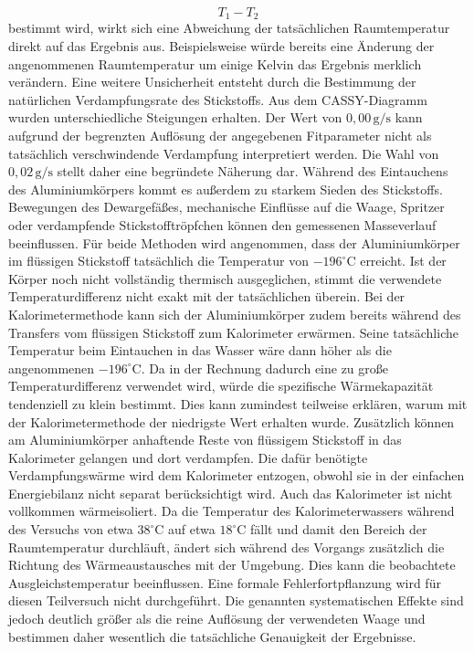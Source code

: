 \documentclass{report}
\begin{document}
\begin{equation}
T_1-T_2
\end{equation}
\noindent
bestimmt wird, wirkt sich eine Abweichung der tatsächlichen Raumtemperatur direkt
auf das Ergebnis aus. Beispielsweise würde bereits eine Änderung der angenommenen
Raumtemperatur um einige Kelvin das Ergebnis merklich verändern.
\noindent
Eine weitere Unsicherheit entsteht durch die Bestimmung der natürlichen
Verdampfungsrate des Stickstoffs. Aus dem CASSY-Diagramm wurden unterschiedliche
Steigungen erhalten. Der Wert von $0{,}00\,\mathrm{g/s}$ kann aufgrund der
begrenzten Auflösung der angegebenen Fitparameter nicht als tatsächlich
verschwindende Verdampfung interpretiert werden. Die Wahl von
$0{,}02\,\mathrm{g/s}$ stellt daher eine begründete Näherung dar.
\noindent
Während des Eintauchens des Aluminiumkörpers kommt es außerdem zu starkem Sieden
des Stickstoffs. Bewegungen des Dewargefäßes, mechanische Einflüsse auf die Waage,
Spritzer oder verdampfende Stickstofftröpfchen können den gemessenen Masseverlauf
beeinflussen.
\noindent
Für beide Methoden wird angenommen, dass der Aluminiumkörper im flüssigen
Stickstoff tatsächlich die Temperatur von $-196^\circ\mathrm{C}$ erreicht.
Ist der Körper noch nicht vollständig thermisch ausgeglichen, stimmt die
verwendete Temperaturdifferenz nicht exakt mit der tatsächlichen überein.
\noindent
Bei der Kalorimetermethode kann sich der Aluminiumkörper zudem bereits während
des Transfers vom flüssigen Stickstoff zum Kalorimeter erwärmen. Seine tatsächliche
Temperatur beim Eintauchen in das Wasser wäre dann höher als die angenommenen
$-196^\circ\mathrm{C}$. Da in der Rechnung dadurch eine zu große
Temperaturdifferenz verwendet wird, würde die spezifische Wärmekapazität
tendenziell zu klein bestimmt. Dies kann zumindest teilweise erklären, warum mit
der Kalorimetermethode der niedrigste Wert erhalten wurde.
\noindent
Zusätzlich können am Aluminiumkörper anhaftende Reste von flüssigem Stickstoff
in das Kalorimeter gelangen und dort verdampfen. Die dafür benötigte
Verdampfungswärme wird dem Kalorimeter entzogen, obwohl sie in der einfachen
Energiebilanz nicht separat berücksichtigt wird.
\noindent
Auch das Kalorimeter ist nicht vollkommen wärmeisoliert. Da die Temperatur des
Kalorimeterwassers während des Versuchs von etwa $38^\circ\mathrm{C}$ auf etwa
$18^\circ\mathrm{C}$ fällt und damit den Bereich der Raumtemperatur durchläuft,
ändert sich während des Vorgangs zusätzlich die Richtung des Wärmeaustausches mit
der Umgebung. Dies kann die beobachtete Ausgleichstemperatur beeinflussen.
\noindent
Eine formale Fehlerfortpflanzung wird für diesen Teilversuch nicht durchgeführt.
Die genannten systematischen Effekte sind jedoch deutlich größer als die reine
Auflösung der verwendeten Waage und bestimmen daher wesentlich die tatsächliche
Genauigkeit der Ergebnisse.
\end{document}
